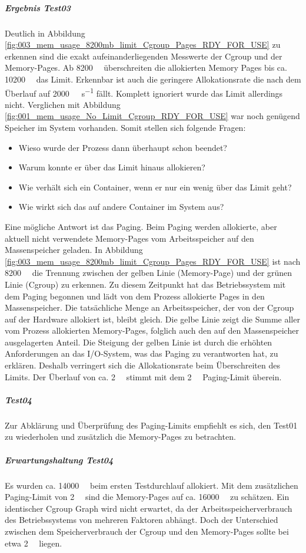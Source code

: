 \subparagraph{Ergebnis Test03}
Deutlich in Abbildung \ref{fig:003_mem_usage_8200mb_limit_Cgroup_Pages_RDY_FOR_USE} zu erkennen sind die exakt aufeinanderliegenden Messwerte der Cgroup und der Memory-Pages. Ab \SI{8200}{\mega\byte} überschreiten die allokierten Memory Pages bis ca. \SI{10200}{\mega\byte} das Limit. Erkennbar ist auch die geringere Allokationsrate die nach dem Überlauf auf \SI{2000}{\mega\byte\per\second} fällt. Komplett ignoriert wurde das Limit allerdings nicht. Verglichen mit Abbildung \ref{fig:001_mem_usage_No_Limit_Cgroup_RDY_FOR_USE} war noch genügend Speicher im System vorhanden. Somit stellen sich folgende Fragen:

\begin{itemize}
    \item Wieso wurde der Prozess dann überhaupt schon beendet?
    \item Warum konnte er über das Limit hinaus allokieren? 
    \item Wie verhält sich ein Container, wenn er nur ein wenig über das Limit geht?
    \item Wie wirkt sich das auf andere Container im System aus?
\end{itemize}


Eine mögliche Antwort ist das Paging. Beim Paging werden allokierte, aber aktuell nicht verwendete Memory-Pages vom Arbeitsspeicher auf den Massenspeicher geladen. In Abbildung \ref{fig:003_mem_usage_8200mb_limit_Cgroup_Pages_RDY_FOR_USE} ist nach \SI{8200}{\mega\byte} die Trennung zwischen der gelben Linie (Memory-Page) und der grünen Linie (Cgroup) zu erkennen. Zu diesem Zeitpunkt hat das Betriebssystem mit dem Paging begonnen und lädt von dem Prozess allokierte Pages in den Massenspeicher. Die tatsächliche Menge an Arbeitsspeicher, der von der Cgroup auf der Hardware allokiert ist, bleibt gleich. Die gelbe Linie zeigt die Summe aller vom Prozess allokierten Memory-Pages, folglich auch den auf den Massenspeicher ausgelagerten Anteil. Die Steigung der gelben Linie ist durch die erhöhten Anforderungen an das I/O-System, was das Paging zu verantworten hat, zu erklären. Deshalb verringert sich die Allokationsrate beim Überschreiten des Limits. Der Überlauf von ca. \SI{2}{\giga\byte} stimmt mit dem \SI{2}{\giga\byte} Paging-Limit überein.

\subparagraph{Test04}
Zur Abklärung und Überprüfung des Paging-Limits empfiehlt es sich, den Test01  zu wiederholen und zusätzlich die Memory-Pages zu betrachten.

\subparagraph{Erwartungshaltung Test04}
Es wurden ca. \SI{14000}{\mega\byte} beim ersten Testdurchlauf allokiert. Mit dem zusätzlichen Paging-Limit von \SI{2}{\giga\byte} sind die Memory-Pages auf ca. \SI{16000}{\mega\byte} zu schätzen. Ein identischer Cgroup Graph wird nicht erwartet, da der Arbeitsspeicherverbrauch des Betriebssystems von mehreren Faktoren abhängt. Doch der Unterschied zwischen dem Speicherverbrauch der Cgroup und den Memory-Pages sollte bei etwa \SI{2}{\giga\byte} liegen. 

